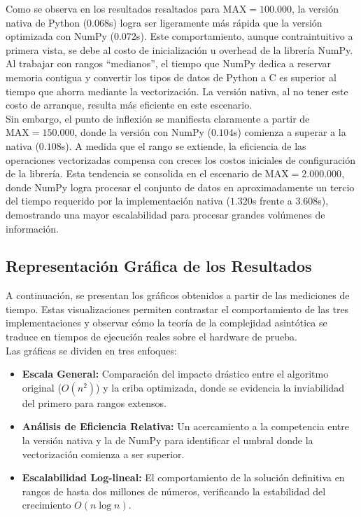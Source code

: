 Como se observa en los resultados resaltados para $\text{MAX} = 100.000$, la versión nativa de Python (0.068s) logra ser ligeramente más rápida que la versión optimizada con NumPy (0.072s).
Este comportamiento, aunque contraintuitivo a primera vista, se debe al costo de inicialización u overhead de la librería NumPy. Al trabajar con rangos ``medianos'', el tiempo que NumPy dedica a reservar memoria contigua y convertir los tipos de datos de Python a C es superior al tiempo que ahorra mediante la vectorización. La versión nativa, al no tener este costo de arranque, resulta más eficiente en este escenario. \\

Sin embargo, el punto de inflexión se manifiesta claramente a partir de $\text{MAX} = 150.000$, donde la versión con NumPy ($0.104$s) comienza a superar a la nativa ($0.108$s). A medida que el rango se extiende, la eficiencia de las operaciones vectorizadas compensa con creces los costos iniciales de configuración de la librería. Esta tendencia se consolida en el escenario de $\text{MAX} = 2.000.000$, donde NumPy logra procesar el conjunto de datos en aproximadamente un tercio del tiempo requerido por la implementación nativa ($1.320$s frente a $3.608$s), demostrando
una mayor escalabilidad para procesar grandes volúmenes de información.

\subsection{Representación Gráfica de los Resultados}
A continuación, se presentan los gráficos obtenidos a partir de las mediciones de tiempo. Estas visualizaciones permiten contrastar el comportamiento de las tres implementaciones y observar cómo la teoría de la complejidad asintótica se traduce en tiempos de ejecución reales sobre el hardware de prueba. \\

Las gráficas se dividen en tres enfoques:
\begin{itemize}
    \item \textbf{Escala General:} Comparación del impacto drástico entre el algoritmo original ($O(n^2)$) y la criba optimizada, donde se evidencia la inviabilidad del primero para rangos extensos.
    \item \textbf{Análisis de Eficiencia Relativa:} Un acercamiento a la competencia entre la versión nativa y la de NumPy para identificar el umbral donde la vectorización comienza a ser superior.
    \item \textbf{Escalabilidad Log-lineal:} El comportamiento de la solución definitiva en rangos de hasta dos millones de números, verificando la estabilidad del crecimiento $O(n \log n)$.
\end{itemize}

